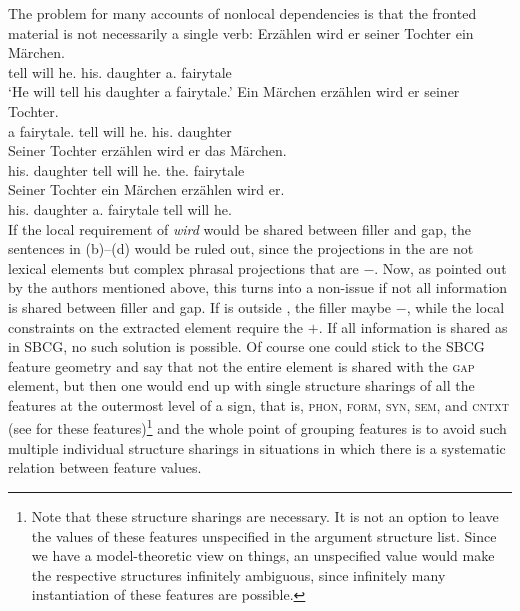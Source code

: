 The problem for many accounts of nonlocal dependencies is that the fronted material is not necessarily a
single verb:
\eal
\label{bsp-erzaehlen-wird}
\ex
\gll Erzählen wird er       seiner Tochter ein Märchen.\\
     tell      will he.\nom{} his.\dat{} daughter   a.\acc{}   fairytale\\
\glt `He will tell his daughter a fairytale.'
\ex
\gll Ein Märchen        erzählen wird er       seiner Tochter.\\
     a   fairytale.\acc{} tell      will he.\nom{} his.\dat{}    daughter\\
\ex  
\gll Seiner Tochter        erzählen wird er       das Märchen.\\
     his.\dat{}    daughter tell     will he.\nom{} the.\acc{} fairytale\\
\ex  
\gll Seiner Tochter        ein Märchen        erzählen wird er.\\
     his.\dat{}    daughter a.\acc{}   fairytale tell      will he.\nom\\
\zl
If the local requirement of \emph{wird} would be shared between filler and gap, the sentences in
(b)--(d) would be ruled out, since the projections in the \vf are not lexical elements
but complex phrasal projections that are \lex$-$. Now, as pointed out by the authors mentioned
above, this turns into a non-issue if not all information is shared between filler and gap. If \lex
is outside \local, the filler maybe \lex$-$, while the local constraints on the extracted element
require the \lexv $+$. If all information is shared as in SBCG, no such solution is possible. Of
course one could stick to the SBCG feature geometry and say that not the entire \argst element is
shared with the \textsc{gap} element, but then one would end up with single structure
sharings of all the features at the outermost level of a sign, that is, \textsc{phon}, \textsc{form}, \textsc{syn},
\textsc{sem}, and \textsc{cntxt} (see \citealp[]{Sag2012a} for these features)\footnote{
  Note that these structure sharings are necessary. It is not an option to leave the values of these
  features unspecified in the argument structure list. Since we have a model-theoretic view on
  things, an unspecified value would make the respective structures infinitely ambiguous, since
  infinitely many instantiation of these features are possible.%
} and the whole point of grouping features is to avoid such multiple
individual structure sharings in situations in which there is a systematic relation between feature values.



